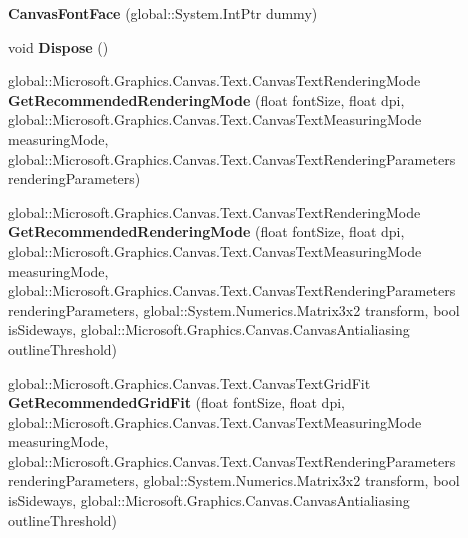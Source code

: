 \begin{DoxyCompactItemize}
\item 
\mbox{\label{class_microsoft_1_1_graphics_1_1_canvas_1_1_text_1_1_canvas_font_face_aef189d914adb999be992b177e5789e32}} 
{\bfseries Canvas\+Font\+Face} (global\+::\+System.\+Int\+Ptr dummy)
\item 
\mbox{\label{class_microsoft_1_1_graphics_1_1_canvas_1_1_text_1_1_canvas_font_face_a929e502ef0c2b824b2a59f1dabbe2fc8}} 
void {\bfseries Dispose} ()
\item 
\mbox{\label{class_microsoft_1_1_graphics_1_1_canvas_1_1_text_1_1_canvas_font_face_a20dec27603e0f42c6754d98b9b3494dc}} 
global\+::\+Microsoft.\+Graphics.\+Canvas.\+Text.\+Canvas\+Text\+Rendering\+Mode {\bfseries Get\+Recommended\+Rendering\+Mode} (float font\+Size, float dpi, global\+::\+Microsoft.\+Graphics.\+Canvas.\+Text.\+Canvas\+Text\+Measuring\+Mode measuring\+Mode, global\+::\+Microsoft.\+Graphics.\+Canvas.\+Text.\+Canvas\+Text\+Rendering\+Parameters rendering\+Parameters)
\item 
\mbox{\label{class_microsoft_1_1_graphics_1_1_canvas_1_1_text_1_1_canvas_font_face_a7ba21595666b01311efff611f0ddc72c}} 
global\+::\+Microsoft.\+Graphics.\+Canvas.\+Text.\+Canvas\+Text\+Rendering\+Mode {\bfseries Get\+Recommended\+Rendering\+Mode} (float font\+Size, float dpi, global\+::\+Microsoft.\+Graphics.\+Canvas.\+Text.\+Canvas\+Text\+Measuring\+Mode measuring\+Mode, global\+::\+Microsoft.\+Graphics.\+Canvas.\+Text.\+Canvas\+Text\+Rendering\+Parameters rendering\+Parameters, global\+::\+System.\+Numerics.\+Matrix3x2 transform, bool is\+Sideways, global\+::\+Microsoft.\+Graphics.\+Canvas.\+Canvas\+Antialiasing outline\+Threshold)
\item 
\mbox{\label{class_microsoft_1_1_graphics_1_1_canvas_1_1_text_1_1_canvas_font_face_a2ce24a3338c9801d118760da55d735a1}} 
global\+::\+Microsoft.\+Graphics.\+Canvas.\+Text.\+Canvas\+Text\+Grid\+Fit {\bfseries Get\+Recommended\+Grid\+Fit} (float font\+Size, float dpi, global\+::\+Microsoft.\+Graphics.\+Canvas.\+Text.\+Canvas\+Text\+Measuring\+Mode measuring\+Mode, global\+::\+Microsoft.\+Graphics.\+Canvas.\+Text.\+Canvas\+Text\+Rendering\+Parameters rendering\+Parameters, global\+::\+System.\+Numerics.\+Matrix3x2 transform, bool is\+Sideways, global\+::\+Microsoft.\+Graphics.\+Canvas.\+Canvas\+Antialiasing outline\+Threshold)

\end{DoxyCompactItemize}
